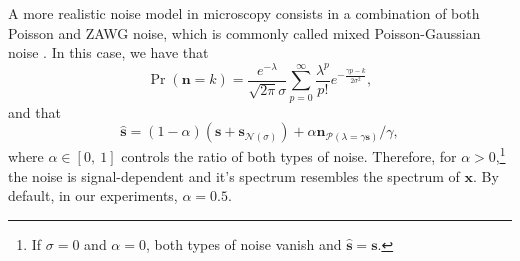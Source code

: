 \documentclass{article}
\begin{document}
A more realistic noise model in microscopy consists in a combination
of both Poisson and ZAWG noise, which is commonly called mixed
Poisson-Gaussian noise \cite{meiniel2018denoising}. In this
case, we have that
\begin{equation}
  \Pr({\mathbf n}{=}k) = \frac{e^{-\lambda}}{\sqrt{2\pi}\sigma}\sum_{p=0}^{\infty}\frac{\lambda^p}{p!} e^{-\frac{\gamma p - k}{2\sigma^2}},
  \label{eq:PN}
\end{equation}
and that
\begin{equation}
  \hat{\mathbf s} = (1-\alpha)(\mathbf{s} + {\mathbf s}_{\mathcal{N}(\sigma)}) + \alpha{\mathbf n}_{\mathcal{P}(\lambda=\gamma\mathbf{s})}/\gamma,
  \label{eq:MPG_noise_model} 
\end{equation}
where $\alpha\in[0,~1]$ controls the ratio of both types of
noise. Therefore, for $\alpha > 0$,\footnote{If $\sigma=0$ and
  $\alpha=0$, both types of noise vanish and
  $\hat{\mathbf{s}}=\mathbf{s}$.} the noise is signal-dependent and
it's spectrum resembles the spectrum of $\mathbf{x}$. By default, in
our experiments, $\alpha=0.5$.








\end{document}
